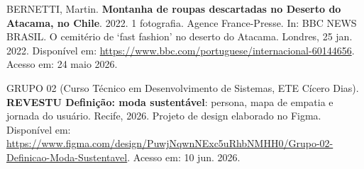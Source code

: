 \documentclass[12pt, a4paper]{article}
\begin{document}
 BERNETTI, Martin. \textbf{Montanha de roupas descartadas no Deserto do Atacama, no Chile}. 2022. 1 fotografia. Agence France-Presse. In: BBC NEWS BRASIL. O cemitério de `fast fashion' no deserto do Atacama. Londres, 25 jan. 2022. Disponível em: \url{https://www.bbc.com/portuguese/internacional-60144656}. Acesso em: 24 maio 2026.

\vspace{6pt}
\vspace{2pt}

 GRUPO 02 (Curso Técnico em Desenvolvimento de Sistemas, ETE Cícero Dias). \textbf{REVESTU \textemdash{} Definição: moda sustentável}: persona, mapa de empatia e jornada do usuário. Recife, 2026. Projeto de design elaborado no Figma. Disponível em: \url{https://www.figma.com/design/PuwjNqwnNExc5uRhbNMHH0/Grupo-02-Definicao-Moda-Sustentavel}. Acesso em: 10 jun. 2026.
\end{document}

